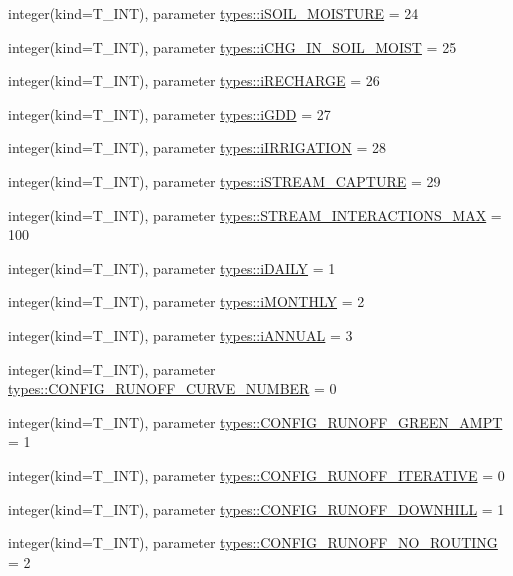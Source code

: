 \begin{DoxyCompactItemize}
\item 
integer(kind=T\_\-INT), parameter \hyperlink{namespacetypes_a71556e5a3ff6e981beafd59949100334}{types::iSOIL\_\-MOISTURE} = 24
\item 
integer(kind=T\_\-INT), parameter \hyperlink{namespacetypes_aebcbdc031290e54d10c818440fbf0edd}{types::iCHG\_\-IN\_\-SOIL\_\-MOIST} = 25
\item 
integer(kind=T\_\-INT), parameter \hyperlink{namespacetypes_adeda65abed18e31c0f523efc82f84bde}{types::iRECHARGE} = 26
\item 
integer(kind=T\_\-INT), parameter \hyperlink{namespacetypes_aefc79ccbcc184af0a988b134d416fb8d}{types::iGDD} = 27
\item 
integer(kind=T\_\-INT), parameter \hyperlink{namespacetypes_a8fc6acfd1e8720c1ee6432e0de5ceff0}{types::iIRRIGATION} = 28
\item 
integer(kind=T\_\-INT), parameter \hyperlink{namespacetypes_a15ee2167fce4158f95e9d9846fda5ad5}{types::iSTREAM\_\-CAPTURE} = 29
\item 
integer(kind=T\_\-INT), parameter \hyperlink{namespacetypes_a4ff333366786c6aa260d0b177b01c29a}{types::STREAM\_\-INTERACTIONS\_\-MAX} = 100
\item 
integer(kind=T\_\-INT), parameter \hyperlink{namespacetypes_ad8ad58046e9a408cde943dcc94b88167}{types::iDAILY} = 1
\item 
integer(kind=T\_\-INT), parameter \hyperlink{namespacetypes_ababe8d6bc68f768e3d42595fb178ac05}{types::iMONTHLY} = 2
\item 
integer(kind=T\_\-INT), parameter \hyperlink{namespacetypes_a6b2dec75398d02bce486b6dd921e1807}{types::iANNUAL} = 3
\item 
integer(kind=T\_\-INT), parameter \hyperlink{namespacetypes_a13d2dc6a53c0611774f26d83189e45e1}{types::CONFIG\_\-RUNOFF\_\-CURVE\_\-NUMBER} = 0
\item 
integer(kind=T\_\-INT), parameter \hyperlink{namespacetypes_a95bb0084d2d95f85aaaf43581e2b0c43}{types::CONFIG\_\-RUNOFF\_\-GREEN\_\-AMPT} = 1
\item 
integer(kind=T\_\-INT), parameter \hyperlink{namespacetypes_a7feb2433c90e8248bbe69792c9b67712}{types::CONFIG\_\-RUNOFF\_\-ITERATIVE} = 0
\item 
integer(kind=T\_\-INT), parameter \hyperlink{namespacetypes_afd1849eb3a3e616a3da9bee8064421fc}{types::CONFIG\_\-RUNOFF\_\-DOWNHILL} = 1
\item 
integer(kind=T\_\-INT), parameter \hyperlink{namespacetypes_a322478702adcb70451718ef549d9071b}{types::CONFIG\_\-RUNOFF\_\-NO\_\-ROUTING} = 2

\end{DoxyCompactItemize}
